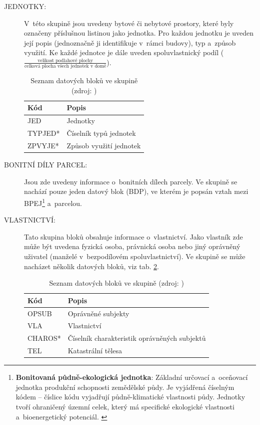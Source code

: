 \documentclass[a4paper,12pt,oneside]{book}
\begin{document}
\begin{description}
 \item[JEDNOTKY:] V~této skupině jsou uvedeny bytové či nebytové prostory, které byly označeny příslušnou listinou jako jednotka. Pro každou jednotku je uveden její popis (jednoznačně ji identifikuje v~rámci budovy), typ a~způsob využití. Ke každé jednotce je dále uveden spoluvlastnický podíl ($\frac{\text{velikost podlahové plochy}}{\text{celková plocha všech jednotek v~domě}}$). \cite{dp_landa}
 
 
\begin{table}[htbp]
\centering
\caption[Seznam datových bloků ve skupině ]{Seznam datových bloků ve skupině  (zdroj: \cite{vfk_struktura})}
\begin{tabular}{ll}
\toprule
\textbf{Kód} & \textbf{Popis} \\ 
\midrule
JED & Jednotky \\ 
TYPJED* & Číselník typů jednotek \\ 
ZPVYJE* & Způsob využití jednotek \\ 
\bottomrule
\end{tabular}
\label{t_skupina_jednotky}
\end{table}

 \newpage
 \item[BONITNÍ DÍLY PARCEL:] Jsou zde uvedeny informace o~bonitních dílech parcely. Ve skupině se nachází pouze jeden datový blok (BDP), ve kterém je popsán vztah mezi BPEJ\footnote{\textbf{Bonitovaná půdně-ekologická jednotka}: Základní určovací a~oceňovací jednotka produkční schopnosti zemědělské půdy. Je vyjádřená číselným kódem -- číslice kódu vyjadřují půdně-klimatické vlastnosti půdy. Jednotky tvoří ohraničený územní celek, který má specifické ekologické vlastnosti a~bioenergetický potenciál. \cite{vugtk}} a~parcelou. \cite{dp_landa}
 
 \item[VLASTNICTVÍ:] Tato skupina bloků obsahuje informace o~vlastnictví. Jako vlastník zde může být uvedena fyzická osoba, právnická osoba nebo jiný oprávněný uživatel (manželé v~bezpodílovém spoluvlastnictví). Ve skupině se může nacházet několik datových bloků, viz tab. \ref{t_skupina_vlastnictvi}. \cite{dp_landa}
 
\begin{table}[htbp]
\centering
\caption[Seznam datových bloků ve skupině ]{Seznam datových bloků ve skupině  (zdroj: \cite{vfk_struktura})}
\begin{tabular}{ll}
\toprule
\textbf{Kód} & \textbf{Popis} \\ 
\midrule
OPSUB & Oprávněné subjekty \\ 
VLA & Vlastnictví \\ 
CHAROS* & Číselník charakteristik oprávněných subjektů \\ 
TEL & Katastrální tělesa \\
\bottomrule
\end{tabular}
\label{t_skupina_vlastnictvi}
\end{table}


\end{description}
\end{document}
